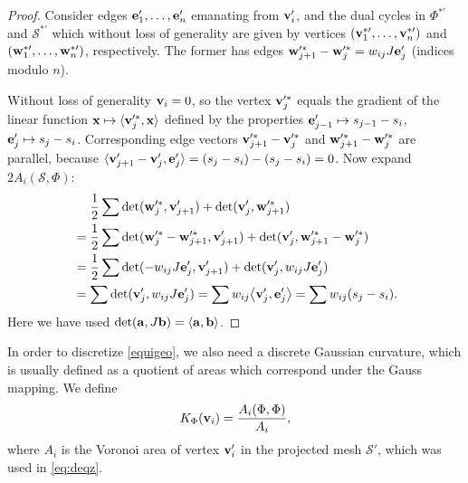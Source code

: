 \documentclass[annual]{acmsiggraph}
\def\<{\mathchoice{\big\langle}{\langle}{\langle}{\langle}}
\def\>{\mathchoice{\big\rangle}{\rangle}{\rangle}{\rangle}}
\def\SS{{\mathcal S}}
\begin{document}
\begin{proof} Consider edges ${\mathbf e}'_1,\dots,{\mathbf e}'_n$ emanating from
${\mathbf v}_i'$, and the dual cycles in $\Phi^{*\prime}$ and $\SS^{*\prime}$
which without loss of generality are given by vertices
$({\mathbf v}^{*\prime}_1,\dots,{\mathbf v}^{*\prime}_n)$ and
$({\mathbf w}^{*\prime}_1,\dots,{\mathbf w}^{*\prime}_n)$, respectively. The former has
edges ${\mathbf w}'^*_{j+1}-{\mathbf w}'^*_j = w_{ij} J{\mathbf e}'_j$ (indices modulo $n$).

Without loss of generality ${\mathbf v}_i=0$, so the vertex ${\mathbf v}'^*_j$ equals the
gradient of the linear function $\xw\mapsto \<\vw'^*_j,\xw\>$ defined by
the properties ${\mathbf e}'_{j-1}\mapsto s_{j-1}-s_i$, ${\mathbf e}'_j\mapsto s_j-s_i$.
Corresponding edge vectors ${\mathbf v}'^*_{j+1}-{\mathbf v}'^*_j$ and
${\mathbf w}'^*_{j+1}-{\mathbf w}'^*_j$ are parallel, because
$\<\vw'_{j+1}-\vw'_j,\ew'_j\>=(s_j-s_i)-(s_j-s_i)=0$. Now expand
$2A_i(\SS,\Phi)$:
	\begin{align*}
	& \mathrel{\hphantom{=}}
		{1\over 2}\sum
		\det(\ww'^*_j, \vw'_{j+1}) + \det(\vw'_j, \ww'^*_{j+1})
	\\
	&=
		{1\over 2}\sum
		\det(\ww'^*_j-\ww'^*_{j+1}, \vw'_{j+1})
		+ \det(\vw'_j, \ww'^*_{j+1}-\ww'^*_j)
		\\
	&=
		{1\over 2}\sum
		\det( - w_{ij} J\ew'_j, \vw'_{j+1})
	 	+ \det(\vw'_j,w_{ij} J\ew'_j)
	\\
	&= 	 \sum \det( \vw'_j, w_{ij} J\ew'_j)
	=	 \sum	w_{ij} \< \vw'_j, \ew'_j\>
	= 	 \sum  w_{ij} (s_j-s_i).
	\end{align*}
 Here we have used $\det(\aw,J\bw)=\<\aw,\bw\>$.
 \end{proof}


In order to discretize \eqref{equigeo}, we also need a discrete Gaussian
curvature, which is usually defined as a quotient of areas which
correspond under the Gauss mapping. We define
	$$
	K_\Phi({\mathbf v}_i) = {A_i(\Phi,\Phi) \over A_i},
	$$
 where $A_i$ is the Voronoi area of vertex ${\mathbf v}_i'$ in the projected mesh
$\SS'$, which was used in \eqref{eq:deqz}.
\end{document}
